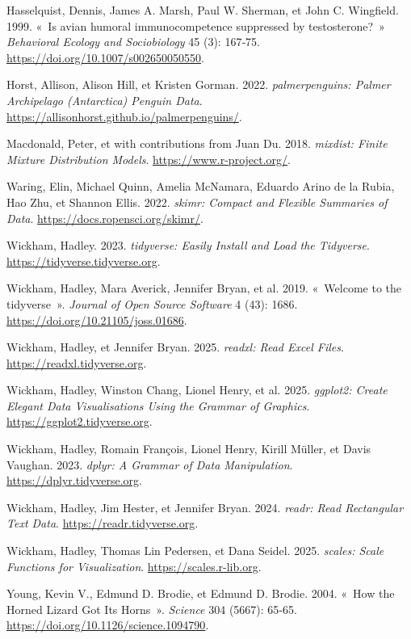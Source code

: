 \documentclass[
  french,
  a4paper,
  DIV=11,
  numbers=noendperiod,
  oneside]{scrreprt}
\newlength{\cslhangindent}
\newenvironment{CSLReferences}[2] %
 {\begin{list}{}{%
  \setlength{\itemindent}{0pt}
  \setlength{\leftmargin}{0pt}
  \setlength{\parsep}{0pt}
  \ifodd #1
   \setlength{\leftmargin}{\cslhangindent}
   \setlength{\itemindent}{-1\cslhangindent}
  \fi
  \setlength{\itemsep}{#2\baselineskip}}}
 {\end{list}}
\begin{document}
\begin{tcolorbox}
\begin{CSLReferences}{1}{1}
Hasselquist, Dennis, James A. Marsh, Paul W. Sherman, et John C.
Wingfield. 1999. {«~Is avian humoral immunocompetence suppressed by
testosterone?~»} \emph{Behavioral Ecology and Sociobiology} 45 (3):
167‑75. \url{https://doi.org/10.1007/s002650050550}.

Horst, Allison, Alison Hill, et Kristen Gorman. 2022.
\emph{palmerpenguins: Palmer Archipelago (Antarctica) Penguin Data}.
\url{https://allisonhorst.github.io/palmerpenguins/}.

Macdonald, Peter, et with contributions from Juan Du. 2018.
\emph{mixdist: Finite Mixture Distribution Models}.
\url{https://www.r-project.org/}.

Waring, Elin, Michael Quinn, Amelia McNamara, Eduardo Arino de la Rubia,
Hao Zhu, et Shannon Ellis. 2022. \emph{skimr: Compact and Flexible
Summaries of Data}. \url{https://docs.ropensci.org/skimr/}.

Wickham, Hadley. 2023. \emph{tidyverse: Easily Install and Load the
Tidyverse}. \url{https://tidyverse.tidyverse.org}.

Wickham, Hadley, Mara Averick, Jennifer Bryan, et al. 2019. {«~Welcome
to the {tidyverse}~»}. \emph{Journal of Open Source Software} 4 (43):
1686. \url{https://doi.org/10.21105/joss.01686}.

Wickham, Hadley, et Jennifer Bryan. 2025. \emph{readxl: Read Excel
Files}. \url{https://readxl.tidyverse.org}.

{Wickham, Hadley, Winston Chang, Lionel Henry, et al.} 2025.
\emph{ggplot2: Create Elegant Data Visualisations Using the Grammar of
Graphics}. \url{https://ggplot2.tidyverse.org}.

Wickham, Hadley, Romain François, Lionel Henry, Kirill Müller, et Davis
Vaughan. 2023. \emph{dplyr: A Grammar of Data Manipulation}.
\url{https://dplyr.tidyverse.org}.

Wickham, Hadley, Jim Hester, et Jennifer Bryan. 2024. \emph{readr: Read
Rectangular Text Data}. \url{https://readr.tidyverse.org}.

Wickham, Hadley, Thomas Lin Pedersen, et Dana Seidel. 2025.
\emph{scales: Scale Functions for Visualization}.
\url{https://scales.r-lib.org}.

Young, Kevin V., Edmund D. Brodie, et Edmund D. Brodie. 2004. {«~How the
Horned Lizard Got Its Horns~»}. \emph{Science} 304 (5667): 65‑65.
\url{https://doi.org/10.1126/science.1094790}.

\end{CSLReferences}

\end{tcolorbox}
\end{document}
